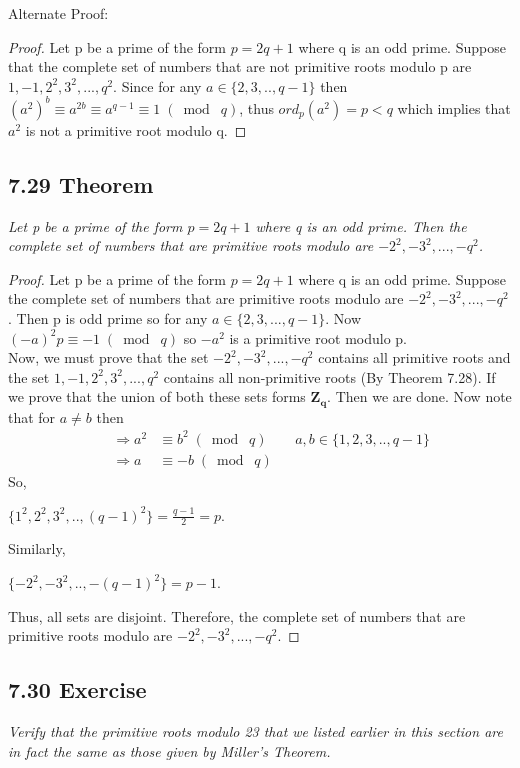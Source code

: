 \documentclass{article}
\begin{document}
Alternate Proof:
\begin{proof}
Let p be a prime of the form $p=2q+1$ where q is an odd prime. Suppose that the complete set of numbers that are not primitive roots modulo p are $1,-1,2^2,3^2,...,q^2$. Since for any $a \in \{2,3,..,q-1\}$ then $(a^2)^b \equiv a^{2b} \equiv a^{q-1} \equiv 1 \;(\bmod\; q)$, thus $ord_p(a^2) = p < q$ which implies that $a^2$ is not a primitive root modulo q. 
\end{proof}

\subsection*{7.29 Theorem} 
\quad \textit{Let p be a prime of the form $p=2q+1$ where q is an odd prime. Then the complete set of numbers that are primitive roots modulo are $-2^2,-3^2,...,-q^2$.}

\begin{proof}
Let p be a prime of the form $p=2q+1$ where q is an odd prime. Suppose the complete set of numbers that are primitive roots modulo are $-2^2,-3^2,...,-q^2$. Then p is odd prime so for any $a \in \{2,3,...,q-1\}$. Now $(-a)^2p \equiv -1 \;(\bmod\; q)$ so $-a^2$ is a primitive root modulo p.\\
Now, we must prove that the set $-2^2,-3^2,...,-q^2$ contains all primitive roots and the set $1,-1,2^2,3^2,...,q^2$ contains all non-primitive roots (By Theorem 7.28). If we prove that the union of both these sets forms $\mathbf{Z_q}$. Then we are done. Now note that for $a \neq b$ then 
\begin{align*}
    &&\Longrightarrow a^2 &\equiv b^2 \;(\bmod\; q) && a,b \in \{1,2,3,..,q-1\}\\
    &&\Longrightarrow a &\equiv -b \;(\bmod\; q) &&
\end{align*}
So,
\begin{center}
    $\{1^2,2^2,3^2,..,(q-1)^2\} = \frac{q-1}{2} = p$.
\end{center}
Similarly,
\begin{center}
    $\{-2^2,-3^2,..,-(q-1)^2\} = p-1$.
\end{center}
Thus, all sets are disjoint. Therefore, the complete set of numbers that are primitive roots modulo are $-2^2,-3^2,...,-q^2$. 
\end{proof}

\subsection*{7.30 Exercise} 
\quad \textit{Verify that the primitive roots modulo 23 that we listed earlier in this section are in fact the same as those given by Miller's Theorem.}
\end{document}
